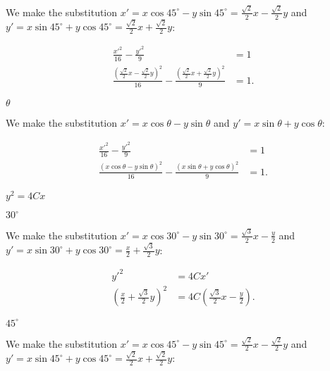 \documentclass[../gatm_answers.tex]{subfiles}
\begin{document}
We make the substitution $x'=x \cos 45^\circ - y\sin 45^\circ=\frac{\sqrt{2}}{2}x-\frac{\sqrt{2}}{2}y$ and $y'=x\sin 45^\circ + y\cos 45^\circ=\frac{\sqrt{2}}{2}x+\frac{\sqrt{2}}{2}y$:

\begin{align*}
\frac{x'^2}{16}-\frac{y'^2}{9} &= 1 \\
\frac{\left(\frac{\sqrt{2}}{2}x-\frac{\sqrt{2}}{2}y\right)^2}{16} - \frac{\left(\frac{\sqrt{2}}{2}x+\frac{\sqrt{2}}{2}y\right)^2}{9} &= 1.
\end{align*}

\begin{iinner_problem}
\item $\theta$
\end{iinner_problem}

We make the substitution $x'=x \cos \theta - y\sin \theta$ and $y'=x\sin \theta + y\cos \theta$:

\begin{align*}
\frac{x'^2}{16}-\frac{y'^2}{9} &= 1 \\
\frac{\left(x \cos \theta - y\sin \theta\right)^2}{16} - \frac{\left(x\sin \theta + y\cos \theta\right)^2}{9} &= 1.
\end{align*}

\begin{inner_problem}
\item $y^2=4Cx$
\end{inner_problem}

\begin{iinner_problem}[start=1]
\item $30^\circ$
\end{iinner_problem}

We make the substitution $x'=x \cos 30^\circ - y\sin 30^\circ=\frac{\sqrt{3}}{2}x-\frac{y}{2}$ and $y'=x\sin 30^\circ + y\cos 30^\circ=\frac{x}{2}+\frac{\sqrt{3}}{2}y$:

\begin{align*}
y'^2&=4Cx' \\
\left(\frac{x}{2}+\frac{\sqrt{3}}{2}y\right)^2 &= 4C\left(\frac{\sqrt{3}}{2}x-\frac{y}{2}\right).
\end{align*}

\begin{iinner_problem}
\item $45^\circ$
\end{iinner_problem}

We make the substitution $x'=x \cos 45^\circ - y\sin 45^\circ=\frac{\sqrt{2}}{2}x-\frac{\sqrt{2}}{2}y$ and $y'=x\sin 45^\circ + y\cos 45^\circ=\frac{\sqrt{2}}{2}x+\frac{\sqrt{2}}{2}y$:
\end{document}

